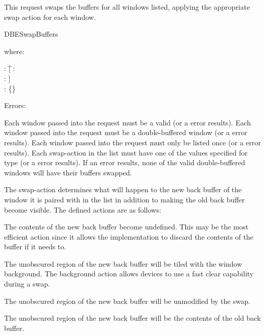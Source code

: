 This request swaps the buffers for all windows listed, applying the
appropriate swap action for each window.

\begin{arequest}{DBESwapBuffers}
\end{arequest}

where:
\begin{tabbing}
: \= [ \= : \\
			\>\> :  ]\\
: \{\}
\end{tabbing}
%
Errors: 

Each window passed into the request must be a valid 
(or a  error results).
Each window passed into the request must
be a double-buffered window (or a  error results).
Each window passed into the request must only be listed once
(or a  error results).
Each swap-action in the list must have one of the
values specified for type  (or a  error
results).  If an error results, none of the valid double-buffered
windows will have their buffers swapped.

The swap-action determines what will happen to the new back
buffer of the window it is paired with in the list in
addition to making the old back buffer become visible.  The
defined actions are as follows:

\begin{description}
\setlength{\labelsep}{2em}
\item[\literal{Undefined}]	The contents of the new back buffer become
			 	undefined.  This may be the most efficient
				action since it allows the implementation to
				discard the contents of the buffer if it needs
				to.

\item[\literal{Background}]	The unobscured region of the new back buffer
				will be tiled with the window background.  The
				background action allows devices to use a fast
				clear capability during a swap.

\item[\literal{Untouched}]	The unobscured region of the new back buffer
				will be unmodified by the swap.

\item[\literal{Copied}]		The unobscured region of the new back buffer
				will be the contents of the old back buffer.
\end{description}

